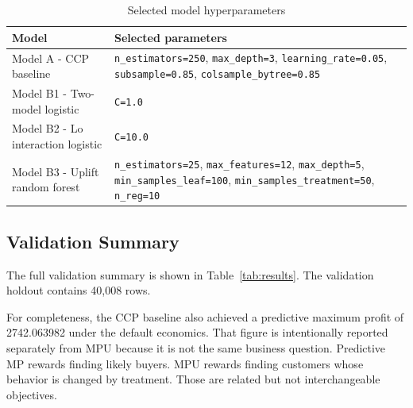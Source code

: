 \documentclass[11pt,a4paper]{article}
\begin{document}
\begin{table}[H]
\centering
\caption{Selected model hyperparameters}
\label{tab:params}
\begin{tabular}{p{} p{}}
\toprule
\textbf{Model} & \textbf{Selected parameters} \\
\midrule
Model A - CCP baseline & \texttt{n\_estimators=250}, \texttt{max\_depth=3}, \texttt{learning\_rate=0.05}, \texttt{subsample=0.85}, \texttt{colsample\_bytree=0.85} \\
Model B1 - Two-model logistic & \texttt{C=1.0} \\
Model B2 - Lo interaction logistic & \texttt{C=10.0} \\
Model B3 - Uplift random forest & \texttt{n\_estimators=25}, \texttt{max\_features=12}, \texttt{max\_depth=5}, \texttt{min\_samples\_leaf=100}, \texttt{min\_samples\_treatment=50}, \texttt{n\_reg=10} \\
\bottomrule
\end{tabular}
\end{table}

\subsection{Validation Summary}
The full validation summary is shown in Table~\ref{tab:results}. The validation holdout contains 40{,}008 rows.

\begin{table}[H]
\centering
\caption{Phase II validation summary}
\label{tab:results}
\small
{}
\normalsize
\end{table}

For completeness, the CCP baseline also achieved a predictive maximum profit of 2742.063982 under the default economics. That figure is intentionally reported separately from MPU because it is not the same business question. Predictive MP rewards finding likely buyers. MPU rewards finding customers whose behavior is changed by treatment. Those are related but not interchangeable objectives.
\end{document}
